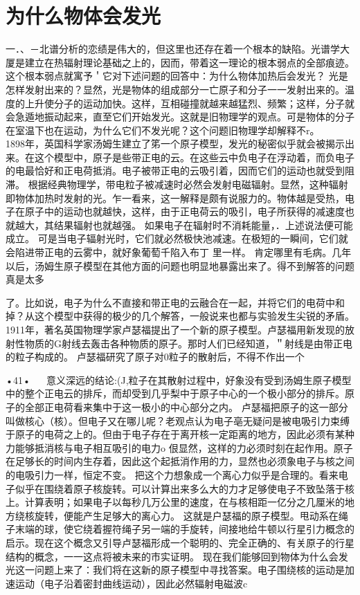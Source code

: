 \section{为什么物体会发光}

一．、－北谱分析的恋绩是伟大的，但这里也还存在着一个根本的缺陷。光谱学大厦是建立在热辐射理论基础之上的，因而，带着这一理论的根本弱点的全部痕迹。这个根本弱点就寓予＇它对下述问题的回答中：为什么物体加热后会发光？
光是怎样发射出来的？显然，光是物体的组成部分一亡原子和分子一一发射出来的。温度的上升使分子的运动加快。这样，互相碰撞就越来越猛烈、频繁；这样，分子就会急遁地振动起来，直至它们开始发光。这就是旧物理学的观点。可是物体的分子在室温下也在运动，为什么它们不发光呢？这个问题旧物理学却解释不r。
  
1898年，英国科学家汤姆生建立了笫一个原子模型，发光的秘密似乎就会被揭示出来。在这个模型中，原子是些带正电的云。在这些云中负电子在浮动着，而负电子的电最恰好和正电荷抵消。电子被带正电的云吸引着，因而它们的运动也就受到阻滞。
根据经典物理学，带电粒子被减速时必然会发射电磁辐射。显然，这种辐射即物体加热时发射的光。乍一看来，这一解释是颇有说服力的。物体越是受热，电子在原子中的运动也就越快，这样，由于正电荷云的吸引，电子所获得的减速度也就越大，其结果辐射也就越强。
如果电子在辐射时不消耗能量，．上述说法便可能成立。
可是当电子辐射光时，它们就必然极快池减速。在极短的一瞬间，它们就会陷进带正电的云雾中，就好象葡萄千陷入布丁
里一样。
肯定哪里有毛病。几年以后，汤姆生原子模型在其他方面的问题也明显地暴露出来了。得不到解答的问题真是太多

了。比如说，电子为什么不直接和带正电的云融合在一起，并将它们的电荷中和掉？从这个模型中获得的极少的几个解答，一般说来也都与实验发生尖锐的矛盾。
1911年，著名英国物理学家卢瑟福提出了一个新的原子模型。卢瑟福用新发现的放射性物质的G射线去轰击各种物质的原子。那时人们已经知道，＂射线是由带正电的粒子构成的。
卢瑟福研究了原子对0粒子的散射后，不得不作出一个

•41•
  
意义深远的结论:(J,粒子在其散射过程中，好象没有受到汤姆生原子模型中的整个正电云的排斥，而却受到几乎梨中于原子中心的一个极小部分的排斥。原子的全部正电荷看来集中于这一极小的中心部分之内。
卢瑟福把原子的这一部分叫做核心（核）。但电子又在哪儿呢？老观点认为电子亳无疑问是被电吸引力束缚于原子的电荷之上的。但由于电子存在于离开核一定距离的地方，因此必须有某种力能够抵消核与电子相互吸引的电力o
佷显然，这样的力必须时刻在起作用。原子在足够长的时间内生存着，因此这个起抵消作用的力，显然也必须象电子与核之间的电吸引力一样，恒定不变。
把这个力想象成一个离心力似乎是合理的。看来电子似乎在围绕着原子核旋转。可以计算出来多么大的力才足够使电子不致坠落于核上。计算表明；如果电子以每秒几万公里的速度，在与核相距一亿分之几厘米的地方绕核旋转，便能产生足够大的离心力。
这就是户瑟福的原子模型。甩动系在绳子末端的球，使它绕着握符绳子另一端的手旋转，间接地给牛顿以行星引力概念的启示。现在这个概念又引导卢瑟福形成一个聪明的、完全正确的、有关原子的行星结构的概念，一一这点将被未来的市实证明。
现在我们能够回到物体为什么会发光这一问题上来了：我们将在这新的原子模型中寻找答案。电子围绕核的运动是加速运动（电子沿着密封曲线运动），因此必然辐射电磁波c


